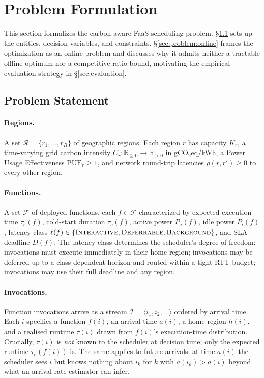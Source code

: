 \section{Problem Formulation}
\label{sec:problem}

This section formalizes the carbon-aware FaaS scheduling problem.
\S\ref{sec:problem:statement} sets up the entities, decision variables,
and constraints. \S\ref{sec:problem:online} frames the optimization as
an online problem and discusses why it admits neither a tractable
offline optimum nor a competitive-ratio bound, motivating the
empirical evaluation strategy in \S\ref{sec:evaluation}.

\subsection{Problem Statement}
\label{sec:problem:statement}

\paragraph{Regions.} A set $\mathcal{R} = \{r_1, \ldots, r_R\}$ of
geographic regions. Each region $r$ has capacity $K_r$, a time-varying
grid carbon intensity $C_r: \mathbb{R}_{\ge 0} \to \mathbb{R}_{>0}$
in gCO$_2$eq/kWh, a Power Usage Effectiveness $\mathrm{PUE}_r \ge 1$,
and network round-trip latencies $\rho(r, r') \ge 0$ to every other
region.

\paragraph{Functions.} A set $\mathcal{F}$ of deployed functions, each
$f \in \mathcal{F}$ characterized by expected execution time
$\tau_e(f)$, cold-start duration $\tau_c(f)$, active power $P_a(f)$,
idle power $P_i(f)$, latency class
$\ell(f) \in \{\textsc{Interactive}, \textsc{Deferrable}, \textsc{Background}\}$, and SLA
deadline $D(f)$. The latency class determines the scheduler's degree
of freedom: \Interactive{} invocations must execute immediately in
their home region; \Deferrable{} invocations may be deferred up to a
class-dependent horizon and routed within a tight RTT budget;
\Background{} invocations may use their full deadline and any region.

\paragraph{Invocations.} Function invocations arrive as a stream
$\mathcal{I} = \langle i_1, i_2, \ldots \rangle$ ordered by arrival
time. Each $i$ specifies a function $f(i)$, an arrival time $a(i)$, a
home region $h(i)$, and a realised runtime $\tau(i)$ drawn from
$f(i)$'s execution-time distribution. Crucially, $\tau(i)$ is
\emph{not} known to the scheduler at decision time; only the
expected runtime $\tau_e(f(i))$ is. The same applies to future
arrivals: at time $a(i)$ the scheduler sees $i$ but knows nothing
about $i_k$ for $k$ with $a(i_k) > a(i)$ beyond what an arrival-rate
estimator can infer.

